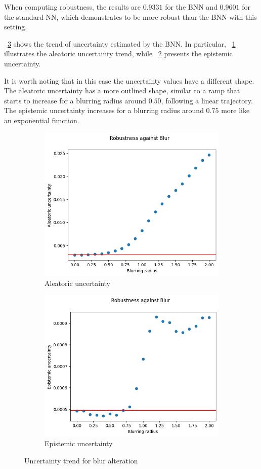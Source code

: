 When computing robustness, the results are $0.9331$ for the BNN and $0.9601$ for the standard NN, which demonstrates to be more robust than the BNN with this setting.

\Fig~\ref{fig:bl_uncertainty} shows the trend of uncertainty estimated by the BNN. In particular, \Fig~\ref{fig:bl_aleatoric} illustrates the aleatoric uncertainty trend, while \Fig~\ref{fig:bl_epistemic} presents the epistemic uncertainty.

It is worth noting that in this case the uncertainty values have a different shape. The aleatoric uncertainty has a more outlined shape, similar to a ramp that starts to increase for a blurring radius around $0.50$, following a linear trajectory. The epistemic uncertainty increases for a blurring radius around $0.75$ more like an exponential function.

\begin{figure}[h]
	\centering
	\begin{subfigure}{.5\textwidth}
		\centering
		\includegraphics[width=0.8\linewidth]{ImageFiles/EvalBNN/BL/aleatoric}
		\caption{Aleatoric uncertainty}
		\label{fig:bl_aleatoric}
	\end{subfigure}%
	\begin{subfigure}{.5\textwidth}
		\centering
		\includegraphics[width=0.8\linewidth]{ImageFiles/EvalBNN/BL/epistemic}
		\caption{Epistemic uncertainty}
		\label{fig:bl_epistemic}
	\end{subfigure}
	\caption{Uncertainty trend for blur alteration}
	\label{fig:bl_uncertainty}
\end{figure}

